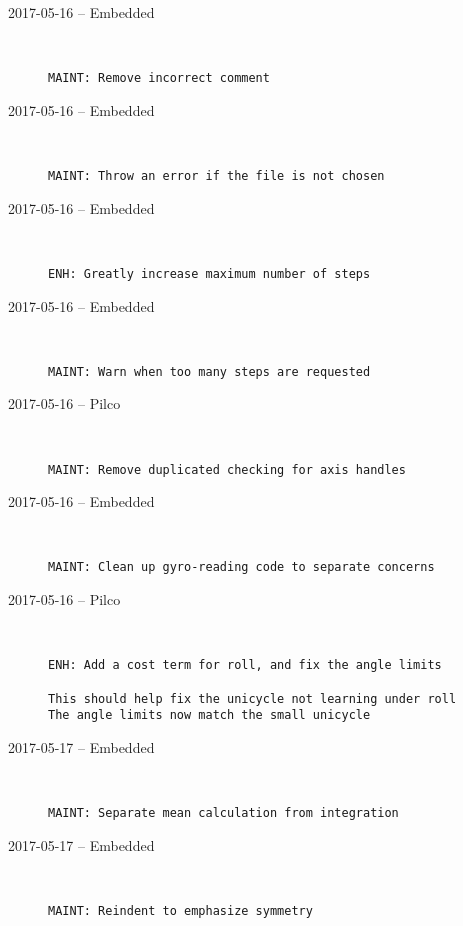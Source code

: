 \begin{description}
  \item[2017-05-16 -- Embedded] \hfill \
\begin{lstlisting}
MAINT: Remove incorrect comment
\end{lstlisting}


  \item[2017-05-16 -- Embedded] \hfill \
\begin{lstlisting}
MAINT: Throw an error if the file is not chosen
\end{lstlisting}


  \item[2017-05-16 -- Embedded] \hfill \
\begin{lstlisting}
ENH: Greatly increase maximum number of steps
\end{lstlisting}


  \item[2017-05-16 -- Embedded] \hfill \
\begin{lstlisting}
MAINT: Warn when too many steps are requested
\end{lstlisting}


  \item[2017-05-16 -- Pilco] \hfill \
\begin{lstlisting}
MAINT: Remove duplicated checking for axis handles
\end{lstlisting}


  \item[2017-05-16 -- Embedded] \hfill \
\begin{lstlisting}
MAINT: Clean up gyro-reading code to separate concerns
\end{lstlisting}


  \item[2017-05-16 -- Pilco] \hfill \
\begin{lstlisting}
ENH: Add a cost term for roll, and fix the angle limits

This should help fix the unicycle not learning under roll
The angle limits now match the small unicycle
\end{lstlisting}


  \item[2017-05-17 -- Embedded] \hfill \
\begin{lstlisting}
MAINT: Separate mean calculation from integration
\end{lstlisting}


  \item[2017-05-17 -- Embedded] \hfill \
\begin{lstlisting}
MAINT: Reindent to emphasize symmetry


\end{lstlisting}
\end{description}
